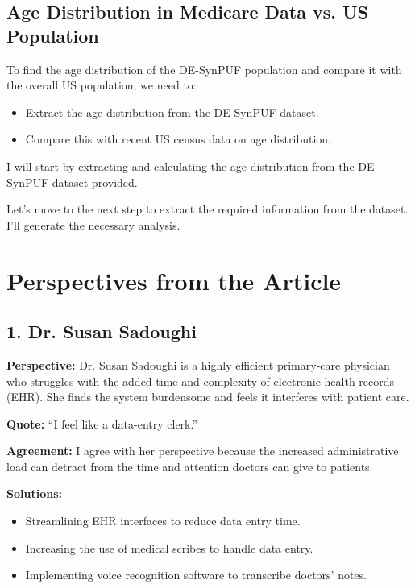 \documentclass{article}
\begin{document}
\subsection*{Age Distribution in Medicare Data vs. US Population}

To find the age distribution of the DE-SynPUF population and compare it with the overall US population, we need to:

\begin{itemize}
    \item Extract the age distribution from the DE-SynPUF dataset.
    \item Compare this with recent US census data on age distribution.
\end{itemize}

I will start by extracting and calculating the age distribution from the DE-SynPUF dataset provided.

Let's move to the next step to extract the required information from the dataset. I'll generate the necessary analysis.

\section*{Perspectives from the Article}

\subsection*{1. Dr. Susan Sadoughi}

\textbf{Perspective:} Dr. Susan Sadoughi is a highly efficient primary-care physician who struggles with the added time and complexity of electronic health records (EHR). She finds the system burdensome and feels it interferes with patient care.

\textbf{Quote:} “I feel like a data-entry clerk.”

\textbf{Agreement:} I agree with her perspective because the increased administrative load can detract from the time and attention doctors can give to patients.

\textbf{Solutions:}
\begin{itemize}
    \item Streamlining EHR interfaces to reduce data entry time.
    \item Increasing the use of medical scribes to handle data entry.
    \item Implementing voice recognition software to transcribe doctors' notes.
\end{itemize}
\end{document}
